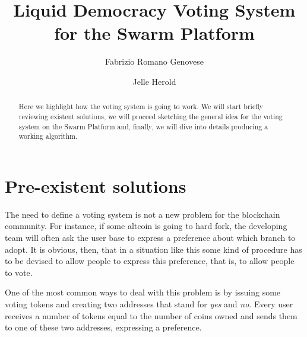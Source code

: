 \documentclass[submission, copyright,creativecommons,sharealike,noncommercial]{eptcs}
\title{Liquid Democracy Voting System for the Swarm Platform}
\author{Fabrizio Romano Genovese
	\institute{Swarm Team}
	\institute{Quantum Group \\ University of Oxford}
	\email{fabrizio@swarm.fund}
\and
Jelle Herold
	\institute{Swarm Team}
	\email{jelle@swarm.fund}
}
\begin{document}
%	
	
	\maketitle

	\begin{abstract}
		Here we highlight how the voting system is going to work. We will start briefly reviewing existent solutions, we will proceed sketching the general idea for the voting system on the Swarm Platform and, finally, we will dive into details producing a working algorithm.
	\end{abstract}

\section{Pre-existent solutions}\label{sec:Pre-existent solutions}
	The need to define a voting system is not a new problem for the blockchain community. For instance, if some altcoin is going to hard fork, the developing team will often ask the user base to express a preference about which branch to adopt. It is obvious, then, that in a situation like this some kind of procedure has to be devised to allow people to express this preference, that is, to allow people to vote.
	
	One of the most common ways to deal with this problem is by issuing some voting tokens and creating two addresses that stand for \emph{yes} and \emph{no}. Every user receives a number of tokens equal to the number of coins owned and sends them to one of these two addresses, expressing a preference.
	
\end{document}
